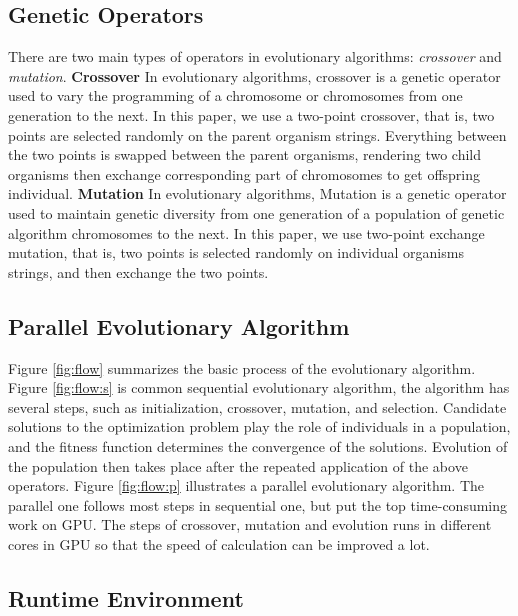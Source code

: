 \subsection{Genetic Operators}
%

There are two main types of operators in evolutionary algorithms:
\emph{crossover} and \emph{mutation}.
\textbf{Crossover}
In evolutionary algorithms, crossover is a genetic operator used to vary the
programming of a chromosome or chromosomes from one generation to the next.  In
this paper, we use a two-point crossover, that is, two points are selected
randomly on the parent organism strings. Everything between the two points is
swapped between the parent organisms, rendering two child organisms then
exchange corresponding part of chromosomes to get offspring individual.
\textbf{Mutation}
In evolutionary algorithms, Mutation is a genetic operator used to maintain
genetic diversity from one generation of a population of genetic algorithm
chromosomes to the next.  In this paper, we use two-point exchange mutation,
that is, two points is selected randomly on individual organisms strings, and
then exchange the two points.

  \vspace{-6mm}
\subsection{Parallel Evolutionary Algorithm}
%
Figure \ref{fig:flow} summarizes the basic process of the evolutionary
algorithm.
Figure \ref{fig:flow:s} is common sequential evolutionary algorithm, the
algorithm has several steps, such as initialization, crossover, mutation, and
selection. Candidate solutions to the optimization problem play the role of
individuals in a population, and the fitness function determines the convergence
of the solutions. Evolution of the population then takes place after the
repeated application of the above operators.
Figure \ref{fig:flow:p} illustrates a parallel evolutionary algorithm. The
parallel one follows most steps in sequential one, but put the top
time-consuming work on GPU. The steps of crossover, mutation and evolution runs
in different cores in GPU so that the speed of calculation can be improved a lot.

  \vspace{-2mm}
\subsection{Runtime Environment}
%

